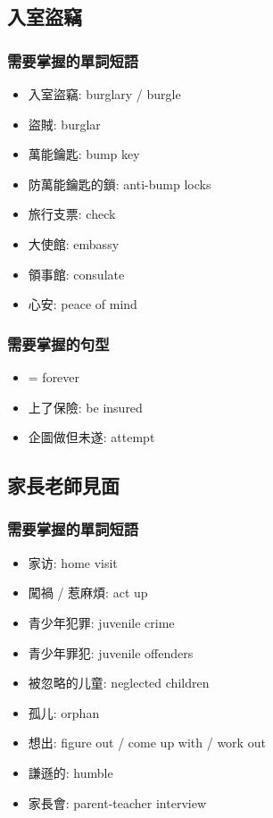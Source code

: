 \subsection{入室盜竊}
\subsubsection*{需要掌握的單詞短語}
\begin{multicols}{3}
\begin{itemize}
  \itemsep0em
  \item 入室盜竊: burglary / burgle
  \item 盜賊: burglar
  \item 萬能鑰匙: bump key
  \item 防萬能鑰匙的鎖: anti-bump locks
  \item 旅行支票:  check
  \item 大使館: embassy
  \item 領事館: consulate
  \item 心安: peace of mind
\end{itemize}
\end{multicols}

\subsubsection*{需要掌握的句型}
\begin{multicols}{3}
\begin{itemize}
  \itemsep0em
  \item {} = forever
  \item 上了保險: be insured
  \item 企圖做但未遂: attempt
\end{itemize}
\end{multicols}

\subsection{家長老師見面}
\subsubsection*{需要掌握的單詞短語}
\begin{multicols}{2}
\begin{itemize}
  \itemsep0em
  \item 家访: home visit
  \item 闖禍 / 惹麻煩: act up
  \item 青少年犯罪: juvenile crime
  \item 青少年罪犯: juvenile offenders
  \item 被忽略的儿童: neglected children
  \item 孤儿: orphan
  \item 想出: figure out / come up with / work out
  \item 謙遜的: humble
  \item 家長會: parent-teacher interview
\end{itemize}
\end{multicols}

